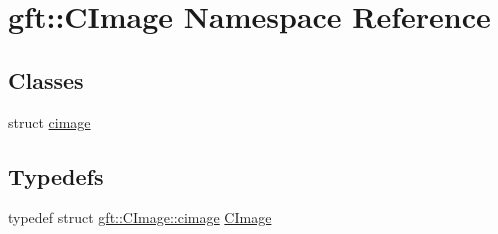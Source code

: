 \hypertarget{namespacegft_1_1CImage}{\section{gft\-:\-:C\-Image Namespace Reference}
\label{namespacegft_1_1CImage}
}
\subsection*{Classes}
\begin{DoxyCompactItemize}
\item 
struct \hyperlink{structgft_1_1CImage_1_1cimage}{cimage}
\end{DoxyCompactItemize}
\subsection*{Typedefs}
\begin{DoxyCompactItemize}
\item 
typedef struct \hyperlink{structgft_1_1CImage_1_1cimage}{gft\-::\-C\-Image\-::cimage} \hyperlink{namespacegft_1_1CImage_ae3efa12a0ed0755314837d3e5c974556}{C\-Image}
\end{DoxyCompactItemize}
